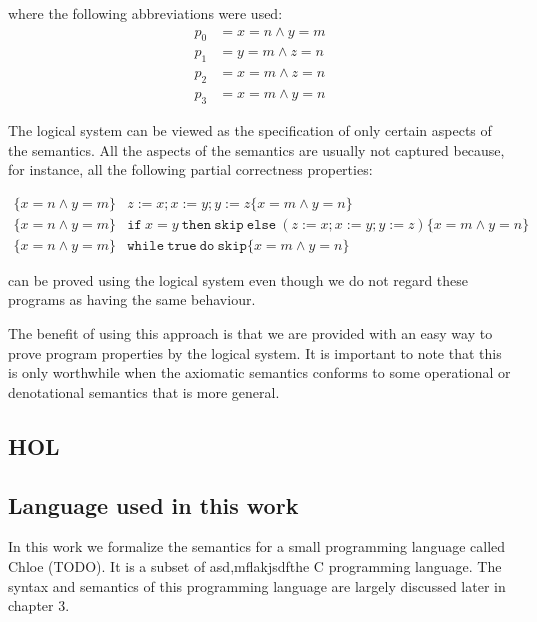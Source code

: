 where the following abbreviations were used:
\begin{align*}
p_{0} &= x=n \land y=m\\
p_{1} &= y=m \land z=n\\
p_{2} &= x=m \land z=n\\
p_{3} &= x=m \land y=n
\end{align*}

The logical system can be viewed as the specification of only certain aspects of the semantics.
All the aspects of the semantics are usually not captured because, for instance, all the following partial correctness properties:

\begin{align*}
\lbrace x=n \land y=m \rbrace & z:=x; x:=y; y:=z                                                \lbrace x=m \land y=n\rbrace\\
\lbrace x=n \land y=m \rbrace & \mathtt{if }\ x = y\ \mathtt{ then}\ \mathtt{ skip }\ \mathtt{ else }\ (z:=x; x:=y; y:=z) \lbrace x=m \land y=n\rbrace\\
\lbrace x=n \land y=m \rbrace & \mathtt{while }\ \mathtt{ true }\ \mathtt{ do }\ \mathtt{ skip }                                    \lbrace x=m \land y=n\rbrace
\end{align*}

can be proved using the logical system even though we do not regard these programs as having the same behaviour.


The benefit of using this approach is that we are provided with an easy way to prove program properties by the logical system.
It is important to note that this is only worthwhile when the axiomatic semantics conforms to some operational or denotational semantics that is more general.



\subsection{HOL}

\subsection{Language used in this work}

In this work we formalize the semantics for a small programming language called Chloe (TODO).
It is a subset of asd,mflakjsdfthe C programming language.
The syntax and semantics of this programming language are largely discussed later in chapter 3.

